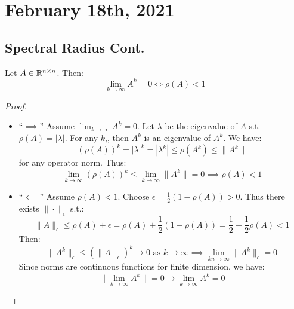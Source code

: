 \documentclass[../main/main.tex]{subfiles}
\begin{document}
\section{February 18th, 2021}
\subsection{Spectral Radius Cont.}
\begin{corollary}
  Let $A \in \mathbb{R}^{n\times n}$. Then: \[
    \lim_{k \to \infty} A^{k} = 0 \iff \rho(A) < 1
  \]
\end{corollary}
\begin{proof}
\begin{itemize}
  \item ``$\implies$'' Assume $\lim_{k \to \infty} A^{k}=0$. Let $\lambda$ be the eigenvalue of $A$ s.t. $\rho(A) = |\lambda|$. For any $k$,, then $A^{k}$ is an eigenvalue of $A^{k}$. We have: \[
(\rho(A))^{k} = |\lambda|^{k} = |\lambda^{k}| \leq \rho(A^{k}) \leq \|A^{k}\|
        \] for any operator norm. Thus: \[
\lim_{k \to \infty} (\rho(A))^{k} \leq \lim_{k \to \infty} \|A^{k}\| = 0 \implies \rho(A) < 1
        \]
  \item ``$\impliedby$'' Assume $\rho(A) < 1$. Choose $\epsilon = \frac{1}{2}(1-\rho(A))>0$. Thus there exists $\|\cdot\|_{\epsilon}$ s.t.: \[
\|A\|_{\epsilon} \leq \rho(A)+\epsilon = \rho(A) + \frac{1}{2}(1-\rho(A)) = \frac{1}{2} + \frac{1}{2}\rho(A) < 1
        \]Then: \[
        \|A^{k}\|_{\epsilon} \leq (\|A\|_{\epsilon})^{k} \to 0 \text{ as }k\to \infty
        \implies \lim_{kn \to \infty} \|A^{k}\|_{\epsilon} = 0
        \]Since norms are continuous functions for finite dimension, we have:\[
        \|\lim_{k \to \infty} A^{k}\| = 0 \to \lim_{k \to \infty} A^{k}=0
        \]
\end{itemize}
\end{proof}
\end{document}
